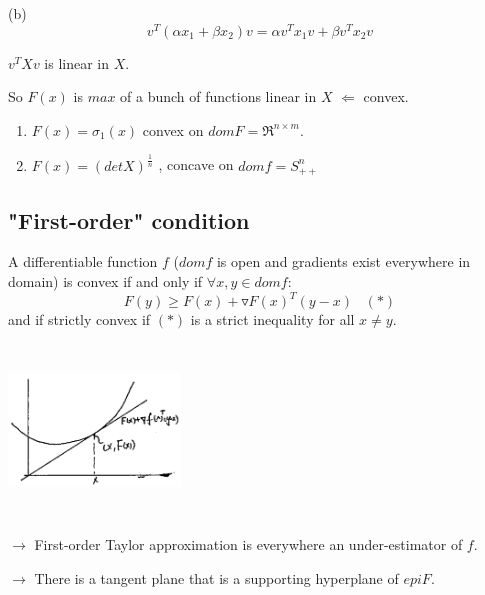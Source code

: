 (b)
\begin{equation*}
v^T(\alpha x_1 + \beta x_2)v = \alpha v^Tx_1v + \beta v^Tx_2v
\end{equation*}


$v^TXv$ is linear in $X$.

So $F(x)$ is $max$ of a bunch of functions linear in $X$ $\Leftarrow$ convex.

\begin{enumerate}
	\item $F(x) = \sigma_1(x)$ convex on $domF =\Re^{n\times m}$.
	
	\item $F(x) = (detX)^{\frac{1}{n}}$ , concave on $domf = S^n_{++}$
\end{enumerate}


\subsection{"First-order" condition}

\begin{theorem}
	A differentiable function $f$ ($domf$ is open and gradients exist everywhere in domain) is convex if and only if $\forall x,y\in domf$:
	\begin{equation*}
	F(y)\geq F(x) + \triangledown F(x)^T(y-x) \,\,\,\,\,  (*)
	\end{equation*}
	and if strictly convex if $(*)$ is a strict inequality for all $x\neq y$.
	
	\begin{marginfigure}
	\centering
	\includegraphics[width=1.8in,height=1.8in]{figures/ch08/figure1106_1.png}
	\end{marginfigure}
	
	$\rightarrow$ First-order Taylor approximation is everywhere an under-estimator of $f$.
	
	$\rightarrow$ There is a tangent plane that is a supporting hyperplane of $epiF$.
\end{theorem}

